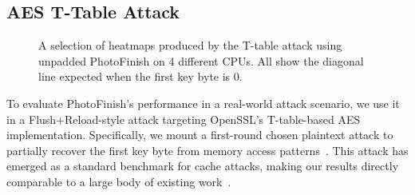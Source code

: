\documentclass[letterpaper,twocolumn,10pt]{article} %
\newcommand{\AttackName}{PhotoFinish\xspace}
\begin{document}
\subsection{AES T-Table Attack}\label{subsec:aes-t-table}


\begin{figure}[t]
    \centering
    \caption{A selection of heatmaps produced by the T-table attack using unpadded \AttackName on \num{4} different CPUs. All show the diagonal line expected when the first key byte is 0.}
    \label{fig:t-table-matrices}
\end{figure}

To evaluate \AttackName's performance in a real-world attack scenario, we use it in a Flush+Reload-style attack targeting OpenSSL's T-table-based AES implementation.
Specifically, we mount a first-round chosen plaintext attack to partially recover the first key byte from memory access patterns~\cite{Osvik2006}.
This attack has emerged as a standard benchmark for cache attacks, making our results directly comparable to a large body of existing work~\cite{Gruss2016Flush,Disselkoen2017prime,VanSchaik2018malicious,Briongos2020reload,Lipp2020takeaway,Purnal2021PrimeScope,Gerlach2023A,Purnal2023showtime,Gerlach2024Hash,Weber2024no,Thomas2025Exfilstate}.
\end{document}
